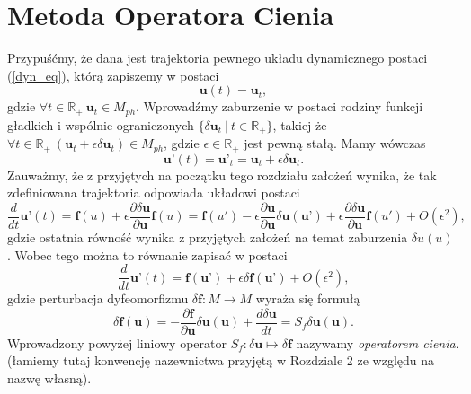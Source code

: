 \documentclass[12pt, twoside]{book}
\begin{document}
\section{Metoda Operatora Cienia}
Przypuśćmy, że dana jest trajektoria pewnego układu dynamicznego postaci (\ref{dyn_eq}), którą zapiszemy w postaci
\begin{equation}
\textbf{u}(t) = \textbf{u}_t,
\label{trajectory}
\end{equation}
gdzie $ \forall t \in \mathbb{R}_{+} \ \textbf{u}_t \in M_{ph}$. Wprowadźmy zaburzenie w postaci rodziny funkcji gładkich i wspólnie ograniczonych $ \{ \delta \textbf{u}_{t} \ |\ t\in \mathbb{R}_{+}\} $, takiej że $ \forall t \in \mathbb{R}_{+} \ (\textbf{u}_t + \epsilon \delta \textbf{u}_{t}) \in M_{ph}$, gdzie $ \epsilon \in \mathbb{R}_{+} $ jest pewną stałą. Mamy wówczas
\begin{equation}
\textbf{u'}(t) = \textbf{u'}_t = \textbf{u}_t + \epsilon \delta \textbf{u}_{t}.
\label{trajectory_pert}
\end{equation}
Zauważmy, że z przyjętych na początku tego rozdziału założeń wynika, że tak zdefiniowana trajektoria odpowiada układowi postaci
\begin{equation}
\frac{d}{dt}\textbf{u'}(t) = \textbf{f}(u) + \epsilon \frac{\partial \delta \textbf{u}}{\partial \textbf{u}}\textbf{f}(u) = \textbf{f}(u') - \epsilon \frac{\partial \textbf{u}}{\partial \textbf{u}}\delta\textbf{u}(\textbf{u'}) + \epsilon \frac{\partial \delta \textbf{u}}{\partial \textbf{u}}\textbf{f}(u') + O(\epsilon^2),
\label{u_perturb}
\end{equation} 
gdzie ostatnia równość wynika z przyjętych założeń na temat zaburzenia $ \delta u(u) $ \cite{Qiqi1}. Wobec tego można to równanie zapisać w postaci
\begin{equation}
\frac{d}{dt}\textbf{u'}(t) = \textbf{f}(\textbf{u'}) + \epsilon \delta \textbf{f}(\textbf{u'}) + O(\epsilon^2),
\label{dyn_eq_pert}
\end{equation}
gdzie perturbacja dyfeomorfizmu $ \delta \textbf{f}: M \rightarrow M $ wyraża się formułą
\begin{equation}
\delta \textbf{f}(\textbf{u}) = -\frac{\partial  \textbf{f}}{\partial \textbf{u}} \delta \textbf{u}(\textbf{u}) +   \frac{d \delta \textbf{u}}{dt} = S_{f} \delta \textbf{u}(\textbf{u}).
\label{funct_pert}
\end{equation}
Wprowadzony powyżej liniowy operator $ S_{f}: \delta \textbf{u} \mapsto \delta \textbf{f} $ nazywamy \textit{operatorem cienia}.(łamiemy tutaj konwencję nazewnictwa przyjętą w Rozdziale 2 ze względu na nazwę własną).\newline
\end{document}
